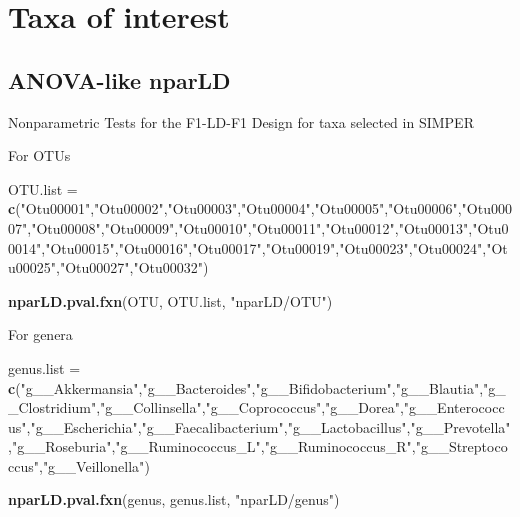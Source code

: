 \documentclass[]{article}
\newenvironment{Shaded}{\begin{snugshade}}{\end{snugshade}}
\newcommand{\KeywordTok}[1]{\textcolor[rgb]{0.13,0.29,0.53}{\textbf{#1}}}
\newcommand{\StringTok}[1]{\textcolor[rgb]{0.31,0.60,0.02}{#1}}
\newcommand{\NormalTok}[1]{#1}
\begin{document}
\section{Taxa of interest}\label{taxa-of-interest}

\subsection{ANOVA-like nparLD}\label{anova-like-nparld}

Nonparametric Tests for the F1-LD-F1 Design for taxa selected in SIMPER

For OTUs

\begin{Shaded}
\begin{Highlighting}[]
\NormalTok{OTU.list =}\StringTok{ }\KeywordTok{c}\NormalTok{(}\StringTok{"Otu00001"}\NormalTok{,}\StringTok{"Otu00002"}\NormalTok{,}\StringTok{"Otu00003"}\NormalTok{,}\StringTok{"Otu00004"}\NormalTok{,}\StringTok{"Otu00005"}\NormalTok{,}\StringTok{"Otu00006"}\NormalTok{,}\StringTok{"Otu00007"}\NormalTok{,}\StringTok{"Otu00008"}\NormalTok{,}\StringTok{"Otu00009"}\NormalTok{,}\StringTok{"Otu00010"}\NormalTok{,}\StringTok{"Otu00011"}\NormalTok{,}\StringTok{"Otu00012"}\NormalTok{,}\StringTok{"Otu00013"}\NormalTok{,}\StringTok{"Otu00014"}\NormalTok{,}\StringTok{"Otu00015"}\NormalTok{,}\StringTok{"Otu00016"}\NormalTok{,}\StringTok{"Otu00017"}\NormalTok{,}\StringTok{"Otu00019"}\NormalTok{,}\StringTok{"Otu00023"}\NormalTok{,}\StringTok{"Otu00024"}\NormalTok{,}\StringTok{"Otu00025"}\NormalTok{,}\StringTok{"Otu00027"}\NormalTok{,}\StringTok{"Otu00032"}\NormalTok{)}

\KeywordTok{nparLD.pval.fxn}\NormalTok{(OTU, OTU.list, }\StringTok{"nparLD/OTU"}\NormalTok{)}
\end{Highlighting}
\end{Shaded}

For genera

\begin{Shaded}
\begin{Highlighting}[]
\NormalTok{genus.list =}\StringTok{ }\KeywordTok{c}\NormalTok{(}\StringTok{"g__Akkermansia"}\NormalTok{,}\StringTok{"g__Bacteroides"}\NormalTok{,}\StringTok{"g__Bifidobacterium"}\NormalTok{,}\StringTok{"g__Blautia"}\NormalTok{,}\StringTok{"g__Clostridium"}\NormalTok{,}\StringTok{"g__Collinsella"}\NormalTok{,}\StringTok{"g__Coprococcus"}\NormalTok{,}\StringTok{"g__Dorea"}\NormalTok{,}\StringTok{"g__Enterococcus"}\NormalTok{,}\StringTok{"g__Escherichia"}\NormalTok{,}\StringTok{"g__Faecalibacterium"}\NormalTok{,}\StringTok{"g__Lactobacillus"}\NormalTok{,}\StringTok{"g__Prevotella"}\NormalTok{,}\StringTok{"g__Roseburia"}\NormalTok{,}\StringTok{"g__Ruminococcus_L"}\NormalTok{,}\StringTok{"g__Ruminococcus_R"}\NormalTok{,}\StringTok{"g__Streptococcus"}\NormalTok{,}\StringTok{"g__Veillonella"}\NormalTok{)}

\KeywordTok{nparLD.pval.fxn}\NormalTok{(genus, genus.list, }\StringTok{"nparLD/genus"}\NormalTok{)}
\end{Highlighting}
\end{Shaded}
\end{document}
